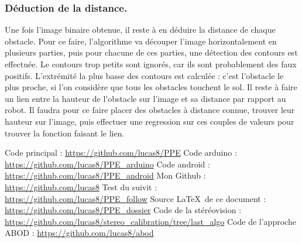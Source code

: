 \documentclass{article}
\begin{document}
\subsubsection{Déduction de la distance.}
Une fois l'image binaire obtenue, il reste à en déduire la distance de chaque obstacle. Pour ce faire, l'algorithme va découper l'image horizontalement en plusieurs parties, puis pour chacune de ces parties, une détection des contours est effectuée. Le contours trop petits sont ignorés, car ils sont probablement des faux positifs. L'extrémité la plus basse des contours est calculée : c'est l'obstacle le plus proche, si l'on considère que tous les obstacles touchent le sol. Il reste à faire un lien entre la hauteur de l'obstacle sur l'image et sa distance par rapport au robot. Il faudra pour ce faire placer des obstacles à distance connue, trouver leur hauteur sur l'image, puis effectuer une regression sur ces couples de valeurs pour trouver la fonction faisant le lien.

\newpage
{}
\listoffigures

\newpage
{}
\begin{thebibliography}{1}
      Code principal : \url{https://github.com/lucas8/PPE}
      Code arduino : \url{https://github.com/lucas8/PPE_arduino}
      Code android : \url{https://github.com/lucas8/PPE_android}
      Mon Github : \url{https://github.com/lucas8}
     Test du suivit : \url{https://github.com/lucas8/PPE_follow}
        Source \LaTeX\ de ce document : \url{https://github.com/lucas8/PPE_dossier}
     Code de la stéréovision : \url{https://github.com/lucas8/stereo_calibration/tree/last_algo}
       Code de l'approche ABOD : \url{https://github.com/lucas8/abod}
\end{thebibliography}
\end{document}
